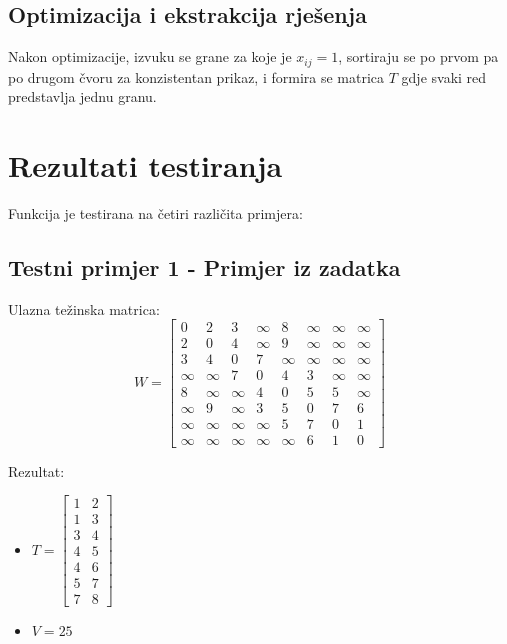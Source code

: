 \documentclass[12pt,a4paper]{article}
\begin{document}
\subsection{Optimizacija i ekstrakcija rješenja}

Nakon optimizacije, izvuku se grane za koje je $x_{ij} = 1$, sortiraju se po prvom pa po drugom čvoru za konzistentan prikaz, i formira se matrica $T$ gdje svaki red predstavlja jednu granu.

\section{Rezultati testiranja}

Funkcija je testirana na četiri različita primjera:

\subsection{Testni primjer 1 - Primjer iz zadatka}

Ulazna težinska matrica:
\begin{equation}
W = \begin{bmatrix}
0 & 2 & 3 & \infty & 8 & \infty & \infty & \infty \\
2 & 0 & 4 & \infty & 9 & \infty & \infty & \infty \\
3 & 4 & 0 & 7 & \infty & \infty & \infty & \infty \\
\infty & \infty & 7 & 0 & 4 & 3 & \infty & \infty \\
8 & \infty & \infty & 4 & 0 & 5 & 5 & \infty \\
\infty & 9 & \infty & 3 & 5 & 0 & 7 & 6 \\
\infty & \infty & \infty & \infty & 5 & 7 & 0 & 1 \\
\infty & \infty & \infty & \infty & \infty & 6 & 1 & 0
\end{bmatrix}
\end{equation}

Rezultat:
\begin{itemize}
\item $T = \begin{bmatrix} 1 & 2 \\ 1 & 3 \\ 3 & 4 \\ 4 & 5 \\ 4 & 6 \\ 5 & 7 \\ 7 & 8 \end{bmatrix}$
\item $V = 25$
\end{itemize}
\end{document}
